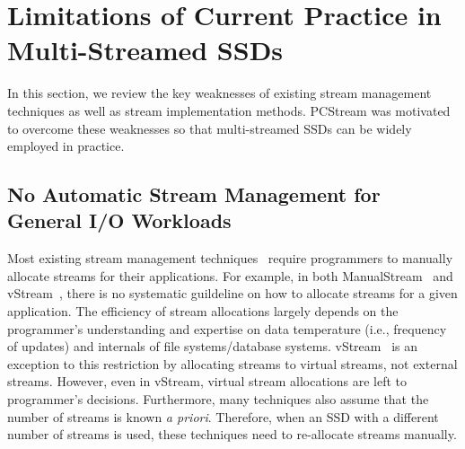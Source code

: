 \section{Limitations of Current Practice in Multi-Streamed SSDs}
In this section, we review the key weaknesses of existing stream management techniques 
as well as stream implementation methods.  
PCStream was motivated to overcome these weaknesses so that multi-streamed
SSDs can be widely employed in practice.


\subsection{No Automatic Stream Management for General I/O Workloads}
Most existing stream management techniques~\cite{MultiStream, Level, vStream} 
require programmers to manually allocate streams for their applications.
For example, 
in both \textsf{\small ManualStream}~\cite{MultiStream} and 
\textsf{\small vStream}~\cite{vStream}, there is no systematic guildeline on how to
allocate streams for a given application. 
The efficiency of stream allocations largely depends on the programmer's 
understanding and expertise on data temperature (i.e., frequency of updates)
and internals of file systems/database systems.
\textsf{\small vStream}~\cite{vStream} 
is an exception to this 
restriction by allocating streams to virtual streams, not external streams.  
However, even in \textsf{\small vStream}, virtual stream allocations are left to
programmer's decisions.
Furthermore, many
techniques also assume that the number of streams is known {\it a priori}.  
Therefore, when an SSD with a different number of streams is used, 
these techniques need to re-allocate streams manually.

